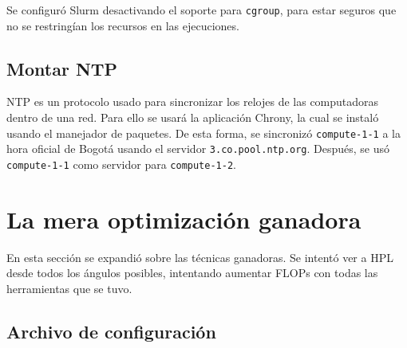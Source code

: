 \documentclass[conference,compsoc]{IEEEtran}
\begin{document}
Se configuró Slurm desactivando el soporte para \verb|cgroup|, para estar seguros que no se restringían los recursos en las ejecuciones.

\subsection{Montar NTP}
NTP es un protocolo usado para sincronizar los relojes de las computadoras dentro de una red. Para ello se usará la aplicación Chrony, la cual se instaló usando el manejador de paquetes. De esta forma, se sincronizó \verb|compute-1-1| a la hora oficial de Bogotá usando el servidor \verb|3.co.pool.ntp.org|. Después, se usó \verb|compute-1-1| como servidor para \verb|compute-1-2|.

\section{La mera optimización ganadora}
En esta sección se expandió sobre las técnicas ganadoras. Se intentó ver a HPL desde todos los ángulos posibles, intentando aumentar FLOPs con todas las herramientas que se tuvo.

\subsection{Archivo de configuración}
\end{document}
